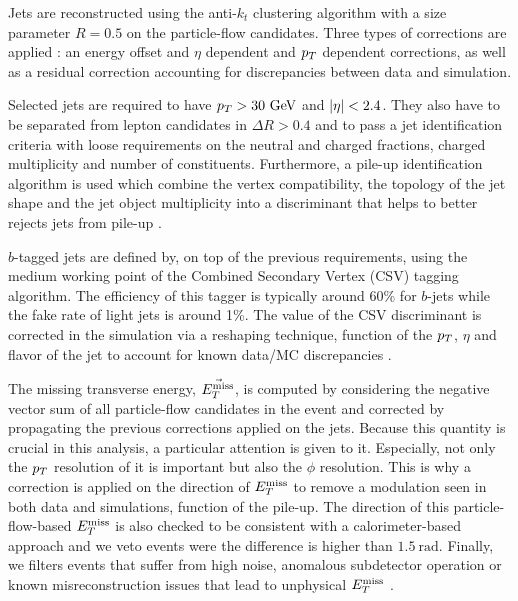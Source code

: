        Jets are reconstructed using the anti-$k_t$ clustering algorithm with a size
       parameter $R = 0.5$ on the particle-flow candidates. Three types of corrections
       are applied : an energy offset and $\eta$ dependent and $p_T$ dependent corrections,
       as well as a residual correction accounting for discrepancies between data and simulation.

       Selected jets are required to have $p_T > 30 ~\text{GeV}$ and $\left| \eta \right| < 2.4$. They also
       have to be separated from lepton candidates in $\Delta R > 0.4$ and to pass a jet
       identification criteria with loose requirements on the neutral and
       charged fractions, charged multiplicity and number of constituents. Furthermore,
       a pile-up identification algorithm is used which combine the vertex compatibility,
       the topology of the jet shape and the jet object multiplicity into a discriminant
       that helps to better rejects jets from pile-up .

       $b$-tagged jets are defined by, on top of the previous requirements, using the
       medium working point of the Combined Secondary Vertex (CSV) tagging algorithm.
       The efficiency of this tagger is typically around 60\% for $b$-jets while the fake
       rate of light jets is around 1\%. The value of the CSV discriminant is corrected in
       the simulation via a reshaping technique, function of the $p_T$, $\eta$ and flavor
       of the jet to account for known data/MC discrepancies .

       The missing transverse energy, $\vec{E_T^\text{miss}}$, is computed by considering the
       negative vector sum of all particle-flow candidates in the event and corrected by
       propagating the previous corrections applied on the jets. Because this quantity is
       crucial in this analysis, a particular attention is given to it. Especially, not only
       the $p_T$ resolution of it is important but also the $\phi$ resolution. This is why
       a correction is applied on the direction of $E_T^\text{miss}$ to remove a modulation seen in
       both data and simulations, function of the pile-up. The direction of this
       particle-flow-based $E_T^\text{miss}$ is also checked to be consistent with a calorimeter-based
       approach and we veto events were the difference is higher than $1.5~\text{rad}$.
       Finally, we filters events that suffer from high noise, anomalous subdetector operation
       or known misreconstruction issues that lead to unphysical $E_T^\text{miss}$ \cite{METperf}.


